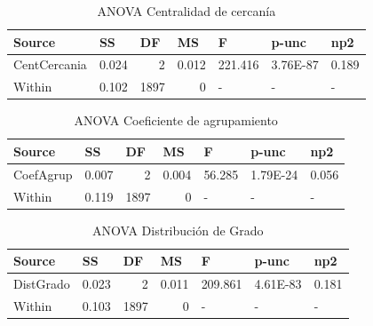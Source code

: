 \documentclass{article}
\begin{document}
\begin{table}[htbp]
  \centering
  \caption{ANOVA Centralidad de cercanía}
    \begin{tabular}{lrrrlll}
    \textbf{Source} & \multicolumn{1}{l}{\textbf{SS}} & \multicolumn{1}{l}{\textbf{DF}} & \multicolumn{1}{l}{\textbf{MS}} & \textbf{F} & \textbf{p-unc} & \textbf{np2} \\
    \midrule
    CentCercania & 0.024 & 2     & 0.012 & \multicolumn{1}{r}{221.416} & \multicolumn{1}{r}{3.76E-87} & \multicolumn{1}{r}{0.189} \\
    Within & 0.102 & 1897  & 0     & -     & -     & - \\
    \bottomrule
    \end{tabular}%
  \label{tab:addlabel}%
\end{table}%

\begin{table}[htbp]
  \centering
  \caption{ANOVA Coeficiente de agrupamiento}
    \begin{tabular}{lrrrlll}
    \textbf{Source} & \multicolumn{1}{l}{\textbf{SS}} & \multicolumn{1}{l}{\textbf{DF}} & \multicolumn{1}{l}{\textbf{MS}} & \textbf{F} & \textbf{p-unc} & \textbf{np2} \\
    \midrule
    CoefAgrup & 0.007 & 2     & 0.004 & \multicolumn{1}{r}{56.285} & \multicolumn{1}{r}{1.79E-24} & \multicolumn{1}{r}{0.056} \\
    Within & 0.119 & 1897  & 0     & -     & -     & - \\
    \bottomrule
    \end{tabular}%
  \label{tab:addlabel}%
\end{table}%

\begin{table}[htbp]
  \centering
  \caption{ANOVA Distribución de Grado}
    \begin{tabular}{lrrrlll}
    \textbf{Source} & \multicolumn{1}{l}{\textbf{SS}} & \multicolumn{1}{l}{\textbf{DF}} & \multicolumn{1}{l}{\textbf{MS}} & \textbf{F} & \textbf{p-unc} & \textbf{np2} \\
    \midrule
    DistGrado & 0.023 & 2     & 0.011 & \multicolumn{1}{r}{209.861} & \multicolumn{1}{r}{4.61E-83} & \multicolumn{1}{r}{0.181} \\
    Within & 0.103 & 1897  & 0     & -     & -     & - \\
    \bottomrule
    \end{tabular}%
  \label{tab:addlabel}%
\end{table}%
\end{document}
